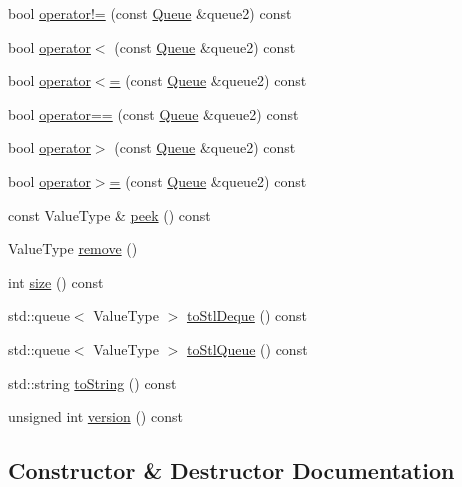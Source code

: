 \begin{DoxyCompactItemize}
\item 
bool \mbox{\hyperlink{classQueue_a385dafd253f98c0a2cec02b5c077cc2e}{operator!=}} (const \mbox{\hyperlink{classQueue}{Queue}} \&queue2) const
\item 
bool \mbox{\hyperlink{classQueue_ad2043e6acdbba5a438b040a2ceda3db7}{operator$<$}} (const \mbox{\hyperlink{classQueue}{Queue}} \&queue2) const
\item 
bool \mbox{\hyperlink{classQueue_aea83f9b16703e7b7a1e46e0746f608c0}{operator$<$=}} (const \mbox{\hyperlink{classQueue}{Queue}} \&queue2) const
\item 
bool \mbox{\hyperlink{classQueue_a85514d93aa9c51e072e2f16ed37ee889}{operator==}} (const \mbox{\hyperlink{classQueue}{Queue}} \&queue2) const
\item 
bool \mbox{\hyperlink{classQueue_afb42a4f29f0857da53e102eb8f77eea6}{operator$>$}} (const \mbox{\hyperlink{classQueue}{Queue}} \&queue2) const
\item 
bool \mbox{\hyperlink{classQueue_ad18096c65e1e4666a4103b559d2c2acd}{operator$>$=}} (const \mbox{\hyperlink{classQueue}{Queue}} \&queue2) const
\item 
const Value\+Type \& \mbox{\hyperlink{classQueue_a74501ededf728c31068dd28a70a8a1f2}{peek}} () const
\item 
Value\+Type \mbox{\hyperlink{classQueue_a025ec97fa5b04552f5ad0902c1f02ac1}{remove}} ()
\item 
int \mbox{\hyperlink{classQueue_af9593d4a5ff4274efaf429cb4f9e57cc}{size}} () const
\item 
std\+::queue$<$ Value\+Type $>$ \mbox{\hyperlink{classQueue_ac7bd339ad0d8fdd48a18540a5046e7de}{to\+Stl\+Deque}} () const
\item 
std\+::queue$<$ Value\+Type $>$ \mbox{\hyperlink{classQueue_a81f999520c8e0cc10ab34041ad56fad2}{to\+Stl\+Queue}} () const
\item 
std\+::string \mbox{\hyperlink{classQueue_a1fe5121d6528fdea3f243321b3fa3a49}{to\+String}} () const
\item 
unsigned int \mbox{\hyperlink{classQueue_a0aa696ccb72cbf928535d6b646bac1aa}{version}} () const
\end{DoxyCompactItemize}


\subsection{Constructor \& Destructor Documentation}
\mbox{\label{classQueue_a9419268280646dc4ab7b01d6fa3741c8}} 
